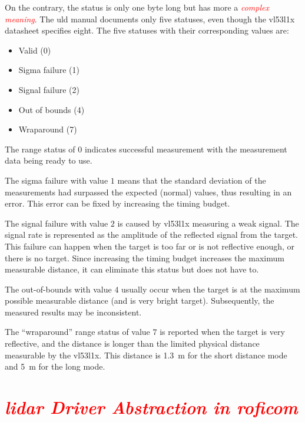 \documentclass[
  digital,     %
  oneside,     %
  nosansbold,  %
  nocolorbold, %
  nolof,         %
  nolot,         %
]{fithesis4}
\newcommand{\TODO}[1]{\textcolor{red}{\textit{#1}}}
\begin{document}
{{{On the contrary, the status is only one byte long but has more a \TODO{complex meaning}. The \acrshort{uld} manual \cite{um2510} documents only five statuses, even though the \gls{vl53l1x} datasheet \cite{vl53l1x} specifies eight. The five statuses with their corresponding values are:
\begin{itemize}
    \item Valid (0)
    \item Sigma failure (1)
    \item Signal failure (2)
    \item Out of bounds (4)
    \item Wraparound (7)
\end{itemize}

The range status of $0$ indicates successful measurement with the measurement data being ready to use.

The sigma failure with value $1$ means that the standard deviation of the measurements had surpassed the expected (normal) values, thus resulting in an error. This error can be fixed by increasing the timing budget.

The signal failure with value $2$ is caused by \gls{vl53l1x} measuring a weak signal. The signal rate is represented as the amplitude of the reflected signal from the target. This failure can happen when the target is too far or is not reflective enough, or there is no target. Since increasing the timing budget increases the maximum measurable distance, it can eliminate this status but does not have to.

The out-of-bounds with value $4$ usually occur when the target is at the maximum possible measurable distance (and is very bright target). Subsequently, the measured results may be inconsistent.

The ``wraparound'' range status of value $7$ is reported when the target is very reflective, and the distance is longer than the limited physical distance measurable by the \gls{vl53l1x}. This distance is \qty{1.3}{\metre} for the short distance mode and \qty{5}{\metre} for the long mode.

\section[ LiDAR Diver ]{ \TODO{ \acrshort{lidar} Driver Abstraction in \acrshort{roficom} } } \label{sec:lidar-driver}

}}}
\end{document}
